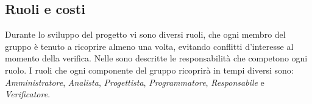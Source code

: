 	\subsection{Ruoli e costi}
	
	Durante lo sviluppo del progetto vi sono diversi ruoli, che ogni membro del gruppo \GroupName{} è tenuto a ricoprire almeno una volta, evitando conflitti d'interesse al momento della verifica. Nelle \NormeDiProgetto{} sono descritte le responsabilità che competono ogni ruolo. I ruoli che ogni componente del gruppo ricoprirà in tempi diversi sono: \textit{Amministratore}, \textit{Analista}, \textit{Progettista}, \textit{Programmatore}, \textit{Responsabile} e \textit{Verificatore}.


